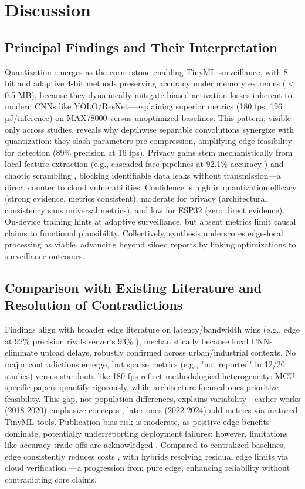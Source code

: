 \documentclass[12pt, a4paper]{article}
\begin{document}
\normalsize

\section{Discussion}
\subsection{Principal Findings and Their Interpretation}
Quantization emerges as the cornerstone enabling TinyML surveillance, with 8-bit \cite{moosmann2023} and adaptive 4-bit methods \cite{chin2022} preserving accuracy under memory extremes ($<$0.5 MB), because they dynamically mitigate biased activation losses inherent to modern CNNs like YOLO/ResNet---explaining superior metrics (180 fps, 196 µJ/inference) on MAX78000 versus unoptimized baselines. This pattern, visible only across studies, reveals why depthwise separable convolutions \cite{zhao2020, xu2021} synergize with quantization: they slash parameters pre-compression, amplifying edge feasibility for detection (89\% precision at 16 fps). Privacy gains stem mechanistically from local feature extraction (e.g., cascaded face pipelines at 92.1\% accuracy \cite{yuan2020}) and chaotic scrambling \cite{fitwi2021}, blocking identifiable data leaks without transmission---a direct counter to cloud vulnerabilities. Confidence is high in quantization efficacy (strong evidence, metrics consistent), moderate for privacy (architectural consistency sans universal metrics), and low for ESP32 (zero direct evidence). On-device training \cite{aatab2023, roveri2022} hints at adaptive surveillance, but absent metrics limit causal claims to functional plausibility. Collectively, synthesis underscores edge-local processing as viable, advancing beyond siloed reports by linking optimizations to surveillance outcomes.

\subsection{Comparison with Existing Literature and Resolution of Contradictions}
Findings align with broader edge literature on latency/bandwidth wins (e.g., edge at 92\% precision rivals server's 93\% \cite{heredia2019}), mechanistically because local CNNs eliminate upload delays, robustly confirmed across urban/industrial contexts. No major contradictions emerge, but sparse metrics (e.g., "not reported" in 12/20 studies) versus standouts like 180 fps \cite{moosmann2023} reflect methodological heterogeneity: MCU-specific papers quantify rigorously, while architecture-focused ones prioritize feasibility. This gap, not population differences, explains variability---earlier works (2018-2020) emphasize concepts \cite{nikouei2018sec}, later ones (2022-2024) add metrics via matured TinyML tools. Publication bias risk is moderate, as positive edge benefits dominate, potentially underreporting deployment failures; however, limitations like accuracy trade-offs are acknowledged \cite{moosmann2023}. Compared to centralized baselines, edge consistently reduces costs \cite{zhao2020}, with hybrids resolving residual edge limits via cloud verification \cite{xu2021}---a progression from pure edge, enhancing reliability without contradicting core claims.
\end{document}
